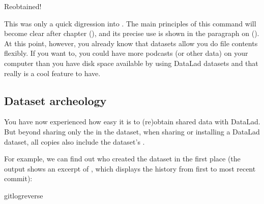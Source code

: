 \sphinxAtStartPar
Reobtained!

\sphinxAtStartPar
This was only a quick digression into . The main principles
of this command will become clear after chapter
{\hyperref[\detokenize{basics/basics-annex:chapter-gitannex}]{}} (), and its precise use is shown in the paragraph on
{\hyperref[\detokenize{basics/101-136-filesystem:remove}]{}} ().
At this point, however, you already know that datasets allow you do
 file contents flexibly. If you want to, you could have more
podcasts (or other data) on your computer than you have disk space available
by using DataLad datasets \textendash{} and that really is a cool feature to have.


\subsection{Dataset archeology}
\label{\detokenize{basics/101-105-install:dataset-archeology}}
\sphinxAtStartPar
You have now experienced how easy it is to (re)obtain shared data with DataLad.
But beyond sharing only the  in the dataset, when sharing or installing
a DataLad dataset, all copies also include the dataset’s .

\ignorespaces 
\sphinxAtStartPar
For example, we can find out who created the dataset in the first place
(the output shows an excerpt of , which displays the
history from first to most recent commit):

%
\begin{sphinxVerbatim}[commandchars=\\\{\}]
gitlog\PYGZhy{}\PYGZhy{}reverse



\end{sphinxVerbatim}
\sphinxresetverbatimhllines

